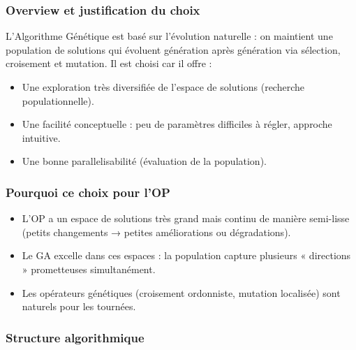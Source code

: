 \documentclass[11pt,a4paper]{article}
\begin{document}
\subsubsection*{Overview et justification du choix}

L'Algorithme Génétique est basé sur l'évolution naturelle : on maintient une population de solutions qui évoluent génération après génération via sélection, croisement et mutation. Il est choisi car il offre :

\begin{itemize}
    \item Une exploration très diversifiée de l'espace de solutions (recherche populationnelle).
    \item Une facilité conceptuelle : peu de paramètres difficiles à régler, approche intuitive.
    \item Une bonne parallelisabilité (évaluation de la population).
\end{itemize}

\subsubsection*{Pourquoi ce choix pour l'OP}

\begin{itemize}
    \item L'OP a un espace de solutions très grand mais continu de manière semi-lisse (petits changements → petites améliorations ou dégradations).
    \item Le GA excelle dans ces espaces : la population capture plusieurs « directions » prometteuses simultanément.
    \item Les opérateurs génétiques (croisement ordonniste, mutation localisée) sont naturels pour les tournées.
\end{itemize}

\subsubsection*{Structure algorithmique}
\end{document}
